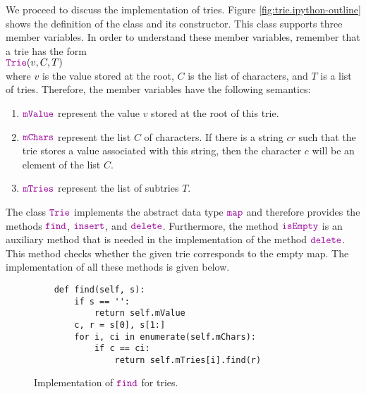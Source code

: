 \noindent
We proceed to discuss the implementation of tries.  Figure \ref{fig:trie.ipython-outline} shows the
definition of the class  and its constructor.  This class supports three member variables.  In order to
understand these member variables, remember that a trie has the form
\\[0.2cm]
\hspace*{1.3cm}
$\mytt{Trie}(v, C, T)$
\\[0.2cm]
where $v$ is the value stored at the root, $C$ is the list of characters, and $T$ is a list of
tries.  Therefore, the member variables have the following semantics:
\begin{enumerate}
\item $\mytt{mValue}$ represent the value $v$ stored at the root of this trie.
\item $\mytt{mChars}$ represent the list  $C$ of characters.  If there is a string $cr$ such that
      the trie stores a value associated with this string, then the character $c$ will be an element of
      the list $C$.
\item $\mytt{mTries}$ represent the list of subtries $T$.  
\end{enumerate}
The class $\mytt{Trie}$ implements the abstract data type $\mytt{map}$ and therefore provides the
methods $\mytt{find}$, $\mytt{insert}$, and $\mytt{delete}$.  Furthermore, the method
$\mytt{isEmpty}$ is an auxiliary method that is needed in the implementation of the method 
$\mytt{delete}$.  This method checks whether the given trie corresponds to the empty map.  The
implementation of all these methods is given below. 

\begin{figure}[!ht]
\centering
\begin{verbatim}
    def find(self, s):
        if s == '':
            return self.mValue
        c, r = s[0], s[1:]
        for i, ci in enumerate(self.mChars):
            if c == ci:
                return self.mTries[i].find(r)
\end{verbatim}
\vspace*{-0.3cm}
\caption{Implementation of $\mytt{find}$ for tries.}
\label{fig:trie.ipython-find}
\end{figure}

